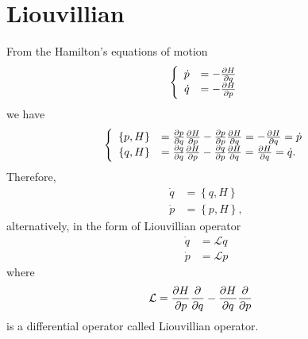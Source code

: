 \section{Liouvillian}

From the Hamilton's equations of motion
\begin{align}
\left\{ 
\begin{array}{rl}
\dot{p} &= -\frac{\partial {H}}{\partial {q}} \\
\dot{q} &= -\frac{\partial {H}}{\partial {p}} 
\end{array} \right.
\end{align}
we have
\begin{align}
\left\{ 
\begin{array}{rl}
\left\{ p,H \right\} &= \frac{\partial {p}}{\partial {q}}\frac{\partial {H}}{\partial {p}} - \frac{\partial {p}}{\partial {p}}\frac{\partial {H}}{\partial {q}}= -\frac{\partial {H}}{\partial {q}}=\dot{p} \\
\left\{ q,H\right\} &= \frac{\partial {q}}{\partial {q}}\frac{\partial {H}}{\partial {p}} - \frac{\partial {q}}{\partial {p}}\frac{\partial {H}}{\partial {q}}= \frac{\partial {H}}{\partial {q}}= \dot{q}.
\end{array} \right.
\end{align}
Therefore, 
\begin{align}
\dot{q} &= \left\{q,H\right\}\\
\dot{p} &= \left\{ p,H\right\},
\end{align}
alternatively, in the form of Liouvillian operator
\begin{align}
\dot{q} &= \mathcal{L} q\\
\dot{p} &= \mathcal{L} p
\end{align}
where
\begin{align}
\mathcal{L} &= \frac{\partial {H}}{\partial {p}}\frac{\partial {}}{\partial {q}} - \frac{\partial {H}}{\partial {q}}\frac{\partial {}}{\partial {p}} 
\end{align}
is a differential operator called Liouvillian operator. 


